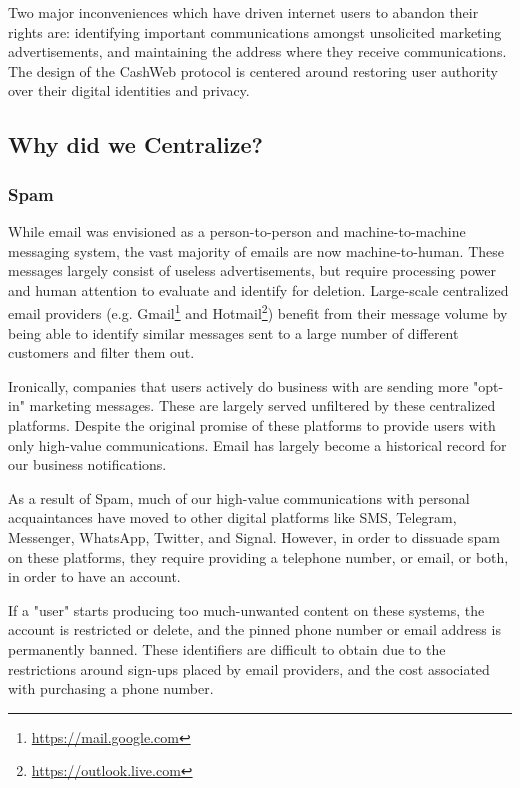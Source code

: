 \documentclass{article}
\theoremstyle{definition}
\begin{document}
Two major inconveniences which have driven internet users to abandon their rights are: identifying important communications amongst unsolicited marketing advertisements, and maintaining the address where they receive communications. The design of the CashWeb protocol is centered around restoring user authority over their digital identities and privacy.

\subsection{Why did we Centralize?}


\subsubsection{Spam}

While email was envisioned as a person-to-person and machine-to-machine messaging system, the vast majority of emails are now machine-to-human. These messages largely consist of useless advertisements, but require processing power and human attention to evaluate and identify for deletion. Large-scale centralized email providers (e.g. Gmail\footnote{\url{https://mail.google.com}} and Hotmail\footnote{\url{https://outlook.live.com}}) benefit from their message volume by being able to identify similar messages sent to a large number of different customers and filter them out.

Ironically, companies that users actively do business with are sending more "opt-in" marketing messages. These are largely served unfiltered by these centralized platforms. Despite the original promise of these platforms to provide users with only high-value communications. Email has largely become a historical record for our business notifications.

As a result of Spam, much of our high-value communications with personal acquaintances have moved to other digital platforms like SMS, Telegram, Messenger, WhatsApp, Twitter, and Signal. However, in order to dissuade spam on these platforms, they require providing a telephone number, or email, or both, in order to have an account.

If a "user" starts producing too much-unwanted content on these systems, the account is restricted or delete, and the pinned phone number or email address is permanently banned. These identifiers are difficult to obtain due to the restrictions around sign-ups placed by email providers, and the cost associated with purchasing a phone number.
\end{document}
